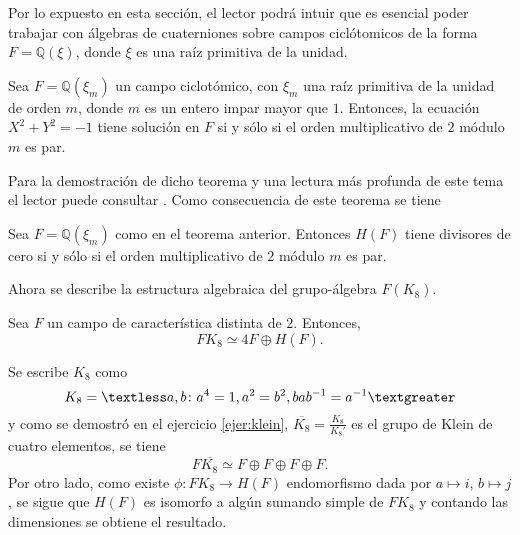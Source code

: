 Por lo expuesto en esta sección, el lector podrá intuir que es esencial poder trabajar con álgebras de cuaterniones sobre campos ciclótomicos de la forma $F = \mathds{Q}(\xi)$, donde $\xi$ es una raíz primitiva de la unidad. 

\begin{teorema}
Sea $F = \mathds{Q}(\xi_m)$ un campo ciclotómico, con $\xi_m$ una raíz primitiva de la unidad de orden $m$, donde $m$ es un entero impar mayor que $1$. Entonces, la ecuación $X^2 + Y^2 = -1$ tiene solución en $F$ si y sólo si el orden multiplicativo de $2$ módulo $m$ es par.
\end{teorema}

Para la demostración de dicho teorema y una lectura más profunda de este tema el lector puede consultar \cite{bib:moser}. Como consecuencia de este teorema se tiene
\begin{lema}
Sea $F = \mathds{Q}(\xi_m)$ como en el teorema anterior. Entonces $H(F)$ tiene divisores de cero si y sólo si el orden multiplicativo de $2$ módulo $m$ es par.
\end{lema}

Ahora se describe la estructura algebraica del grupo-álgebra $F(K_8)$.

\begin{lema}\label{lem:K8}
Sea $F$ un campo de característica distinta de $2 $. Entonces,
\begin{equation*}
FK_8 \simeq 4F\oplus H(F).
\end{equation*}
\end{lema}
\begin{proof*}
Se escribe $K_8$ como
\begin{equation*}
K_8 = \textless a, b \colon a^4 = 1, a^2 = b^2, bab^{-1} = a^{-1} \textgreater
\end{equation*}
y como se demostró en el ejercicio \ref{ejer:klein}, $\overline{K_8} = \frac{K_8}{K_8'}$ es el grupo de Klein de cuatro elementos, se tiene
\begin{equation*}
F\overline{K_8} \simeq F \oplus F \oplus F \oplus F.
\end{equation*}
Por otro lado, como existe $\phi \colon FK_8 \to H(F)$ endomorfismo dada por $a \mapsto i$, $b \mapsto j$, se sigue que $H(F)$ es isomorfo a algún sumando simple de $FK_8$ y contando las dimensiones se obtiene el resultado. 
\end{proof*}

